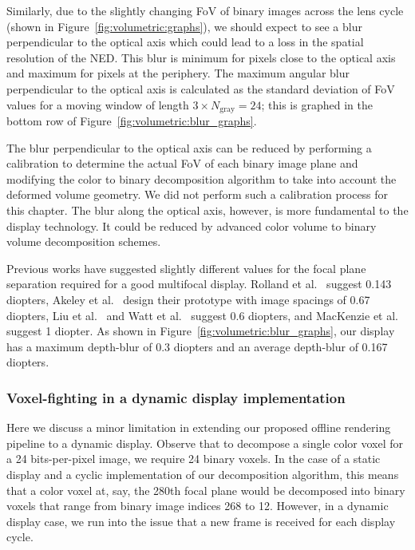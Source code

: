 Similarly, due to the slightly changing FoV of binary images across the lens cycle (shown in Figure~\ref{fig:volumetric:graphs}), we should expect to see a blur perpendicular to the optical axis which could lead to a loss in the spatial resolution of the NED. This blur is minimum for pixels close to the optical axis and maximum for pixels at the periphery. The maximum angular blur perpendicular to the optical axis is calculated as the standard deviation of FoV values for a moving window of length $3 \times N_{\text{gray}}=24$; this is graphed in the bottom row of Figure~\ref{fig:volumetric:blur_graphs}.

The blur perpendicular to the optical axis can be reduced by performing a calibration to determine the actual FoV of each binary image plane and modifying the color to binary decomposition algorithm to take into account the deformed volume geometry. We did not perform such a calibration process for this chapter. The blur along the optical axis, however, is more fundamental to the display technology. It could be reduced by advanced color volume to binary volume decomposition schemes. 

Previous works have suggested slightly different values for the focal plane separation required for a good multifocal display. Rolland et al.~\cite{Rolland1999dynamic} suggest 0.143 diopters, Akeley et al.~\cite{Akeley2004stereo} design their prototype with image spacings of 0.67 diopters, Liu et al.~\cite{Liu2010systematic} and Watt et al.~\cite{Watt2012Real} suggest 0.6 diopters, and MacKenzie et al.~\cite{MacKenzie2010Accommodation} suggest 1 diopter. As shown in Figure~\ref{fig:volumetric:blur_graphs}, our display has a maximum depth-blur of 0.3 diopters and an average depth-blur of 0.167 diopters. 



\subsubsection{Voxel-fighting in a dynamic display implementation}
Here we discuss a minor limitation in extending our proposed offline rendering pipeline to a dynamic display. Observe that to decompose a single color voxel for a 24 bits-per-pixel image, we require 24 binary voxels. In the case of a static display and a cyclic implementation of our decomposition algorithm, this means that a color voxel at, say, the 280th focal plane would be decomposed into binary voxels that range from binary image indices 268 to 12. However, in a dynamic display case, we run into the issue that a new frame is received for each display cycle. 

